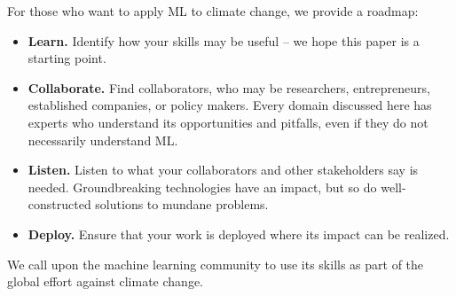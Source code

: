 \documentclass[11pt]{report}
\begin{document}


For those who want to apply ML to climate change, we provide a roadmap:
\begin{itemize}
    \item \textbf{Learn.} Identify how your skills may be useful -- we hope this paper is a starting point.
    \item \textbf{Collaborate.} Find collaborators, who may be researchers, entrepreneurs, established companies, or policy makers. Every domain discussed here has experts who understand its opportunities and pitfalls, even if they do not necessarily understand ML.
    \item \textbf{Listen.} Listen to what your collaborators and other stakeholders say is needed. Groundbreaking technologies have an impact, but so do well-constructed solutions to mundane problems.
    \item \textbf{Deploy.} Ensure that your work is deployed where its impact can be realized.
\end{itemize}
We call upon the machine learning community to use its skills as part of the global effort against climate change.
\end{document}
